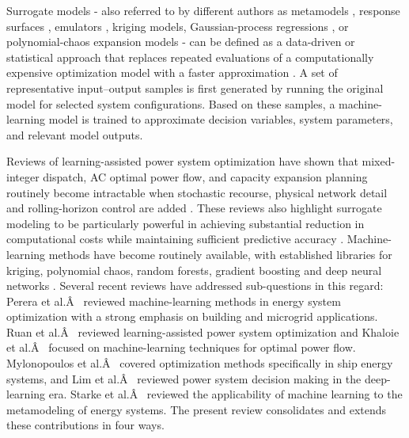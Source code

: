 \documentclass[final,5p,times,twocolumn]{elsarticle}
\begin{document}
Surrogate models - also referred to by different authors as metamodels
\cite{Roth2019214,Hirvonen2017323,Jia2022553,Xiao2018,Li2023,Wang2020202933,Starke2025214},
response surfaces
\cite{Ahmad202451,Salahinezhad2025,Xu20212696,Schulte2020,Roy2023},
emulators \cite{Hu2020,Volodina2022,Lawson201647}, kriging models,
Gaussian-process regressions
\cite{Deng2020831,Nikolaidis2021,Li2021,Perera2019191}, or
polynomial-chaos expansion models
\cite{Muhlpfordt20194806,Safta20172535,Koirala20242284,Xu20212696} -
can be defined as a data-driven or statistical approach that replaces
repeated evaluations of a computationally expensive optimization model
with a faster approximation
\cite{Perera2019191,Ruan2021221,Starke2025214,Khaloie2025,Mylonopoulos202332697,Su2022315,Thrampoulidis2021,Han2018622}.
A set of representative input--output samples is first generated by
running the original model for selected system configurations. Based on
these samples, a machine-learning model is trained to approximate
decision variables, system parameters, and relevant model outputs.

Reviews of learning-assisted power system optimization have shown that
mixed-integer dispatch, AC optimal power flow, and capacity expansion
planning routinely become intractable when stochastic recourse, physical
network detail and rolling-horizon control are added
\cite{Ruan2021221,Khaloie2025,Lim2025,Mylonopoulos202332697,Perera2019191}.
These reviews also highlight surrogate modeling to be particularly
powerful in achieving substantial reduction in computational costs while
maintaining sufficient predictive accuracy
\cite{Ruan2021221,Perera2019191,Starke2025214,Khaloie2025,Mylonopoulos202332697}.
Machine-learning methods have become routinely available, with
established libraries for kriging, polynomial chaos, random forests,
gradient boosting and deep neural networks
\cite{Perera2019191,Starke2025214,Khaloie2025,Elsheikh2019622}.
Several recent reviews have addressed sub-questions in this regard:
Perera et al.Â~\cite{Perera2019191} reviewed machine-learning methods in
energy system optimization with a strong emphasis on building and
microgrid applications. Ruan et al.Â~\cite{Ruan2021221} reviewed
learning-assisted power system optimization and Khaloie et
al.Â~\cite{Khaloie2025} focused on machine-learning techniques for optimal
power flow. Mylonopoulos et al.Â~\cite{Mylonopoulos202332697} covered
optimization methods specifically in ship energy systems, and Lim et
al.Â~\cite{Lim2025} reviewed power system decision making in the
deep-learning era. Starke et al.Â~\cite{Starke2025214} reviewed the
applicability of machine learning to the metamodeling of energy systems.
The present review consolidates and extends these contributions in four
ways.
\end{document}

